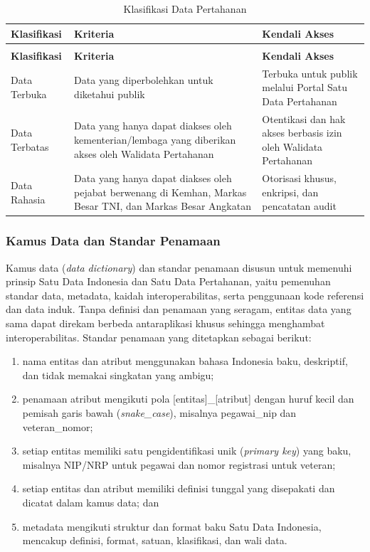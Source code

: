 \begin{longtable}{@{}>{\raggedright\arraybackslash}p{}>{\raggedright\arraybackslash}p{}>{\raggedright\arraybackslash}p{}@{}}
\caption{Klasifikasi Data Pertahanan}
\label{tab:d4-14}\\
\toprule
\textbf{Klasifikasi} & \textbf{Kriteria} & \textbf{Kendali Akses}\\
\midrule
\endfirsthead
\multicolumn{3}{@{}l}{\small\itshape \tablename\ \thetable{} (lanjutan)}\\
\toprule
\textbf{Klasifikasi} & \textbf{Kriteria} & \textbf{Kendali Akses}\\
\midrule
\endhead
\bottomrule
\endlastfoot
Data Terbuka & Data yang diperbolehkan untuk diketahui publik & Terbuka untuk publik melalui Portal Satu Data Pertahanan\\
Data Terbatas & Data yang hanya dapat diakses oleh kementerian/lembaga yang diberikan akses oleh Walidata Pertahanan & Otentikasi dan hak akses berbasis izin oleh Walidata Pertahanan\\
Data Rahasia & Data yang hanya dapat diakses oleh pejabat berwenang di Kemhan, Markas Besar TNI, dan Markas Besar Angkatan & Otorisasi khusus, enkripsi, dan pencatatan audit\\
\end{longtable}

\subsubsection{Kamus Data dan Standar Penamaan}

Kamus data (\textit{data dictionary}) dan standar penamaan disusun untuk memenuhi prinsip Satu Data Indonesia dan Satu Data Pertahanan, yaitu pemenuhan standar data, metadata, kaidah interoperabilitas, serta penggunaan kode referensi dan data induk. Tanpa definisi dan penamaan yang seragam, entitas data yang sama dapat direkam berbeda antaraplikasi khusus sehingga menghambat interoperabilitas. Standar penamaan yang ditetapkan sebagai berikut:

\begin{enumerate}[label=\alph*.]
  \item nama entitas dan atribut menggunakan bahasa Indonesia baku, deskriptif, dan tidak memakai singkatan yang ambigu;
  \item penamaan atribut mengikuti pola [entitas]\_[atribut] dengan huruf kecil dan pemisah garis bawah (\textit{snake\_case}), misalnya pegawai\_nip dan veteran\_nomor;
  \item setiap entitas memiliki satu pengidentifikasi unik (\textit{primary key}) yang baku, misalnya NIP/NRP untuk pegawai dan nomor registrasi untuk veteran;
  \item setiap entitas dan atribut memiliki definisi tunggal yang disepakati dan dicatat dalam kamus data; dan
  \item metadata mengikuti struktur dan format baku Satu Data Indonesia, mencakup definisi, format, satuan, klasifikasi, dan wali data.
\end{enumerate}

